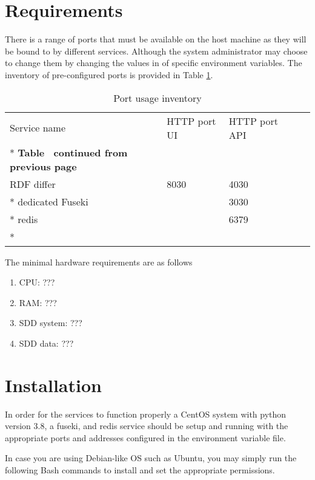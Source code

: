 \section{Requirements}
\label{sec:requirements}
There is a range of ports that must be available on the host machine as they will be bound to by different services. Although the system administrator may choose to change them by changing the values in of specific environment variables. The inventory of pre-configured ports is provided in Table \ref{tab:port-inventory}.

\begin{longtable}[c]{@{}p{3.64cm}p{1.25cm}p{1.25cm}p{1.9cm}p{5cm}@{}}
	\toprule
	Service name     & HTTP port UI & HTTP port API             \\* \midrule
	\endfirsthead
	\multicolumn{5}{c}%
	{{\bfseries Table \thetable\ continued from previous page}} \\
	\endhead
	\bottomrule
	\endfoot
	\endlastfoot
	RDF differ       & 8030         & 4030                      \\* \hline
	dedicated Fuseki &              & 3030                      \\* \hline
	redis            &              & 6379                      \\* \bottomrule
	\caption{Port usage inventory}
	\label{tab:port-inventory}                                  \\
\end{longtable}

The minimal hardware requirements are as follows 
\begin{enumerate}
	\item CPU: ???
	\item RAM: ???
	\item SDD system: ???
	\item SDD data: ???
\end{enumerate}

\section{Installation}
\label{sec:installation}
In order for the services to function properly a CentOS system with python version 3.8, a fuseki, and redis service should be setup and running with the appropriate ports and addresses configured in the environment variable file. 

In case you are using Debian-like OS such as Ubuntu, you may simply run the following Bash commands to install and set the appropriate permissions.


